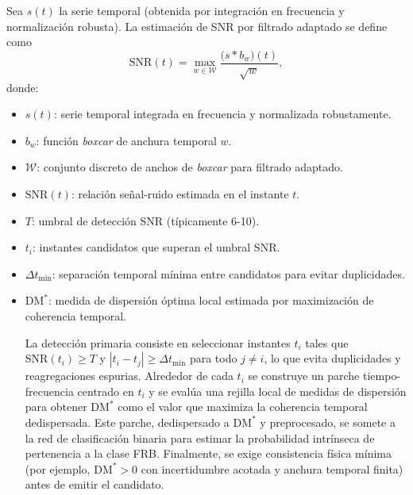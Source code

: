Sea $s(t)$ la serie temporal (obtenida por integración en frecuencia y normalización robusta). La estimación de SNR por filtrado adaptado se define como
\[
\mathrm{SNR}(t) = \max_{w\in\mathcal{W}} \frac{\big(s * b_w\big)(t)}{\sqrt{w}},
\]
\noindent donde:
\begin{itemize}
    \item $s(t)$: serie temporal integrada en frecuencia y normalizada robustamente.
    \item $b_w$: función \textit{boxcar} de anchura temporal $w$.
    \item $\mathcal{W}$: conjunto discreto de anchos de \textit{boxcar} para filtrado adaptado.
    \item $\mathrm{SNR}(t)$: relación señal-ruido estimada en el instante $t$.
    \item $T$: umbral de detección SNR (típicamente 6-10).
    \item $t_i$: instantes candidatos que superan el umbral SNR.
    \item $\Delta t_{\min}$: separación temporal mínima entre candidatos para evitar duplicidades.
    \item $\mathrm{DM}^*$: medida de dispersión óptima local estimada por maximización de coherencia temporal.

La detección primaria consiste en seleccionar instantes $t_i$ tales que $\mathrm{SNR}(t_i)\ge T$ y $|t_i-t_j|\ge \Delta t_{\min}$ para todo $j\ne i$, lo que evita duplicidades y reagregaciones espurias. Alrededor de cada $t_i$ se construye un parche tiempo-frecuencia centrado en $t_i$ y se evalúa una rejilla local de medidas de dispersión para obtener $\mathrm{DM}^*$ como el valor que maximiza la coherencia temporal dedispersada. Este parche, dedispersado a $\mathrm{DM}^*$ y preprocesado, se somete a la red de clasificación binaria para estimar la probabilidad intrínseca de pertenencia a la clase FRB. Finalmente, se exige consistencia física mínima (por ejemplo, $\mathrm{DM}^*>0$ con incertidumbre acotada y anchura temporal finita) antes de emitir el candidato.

\end{itemize}

